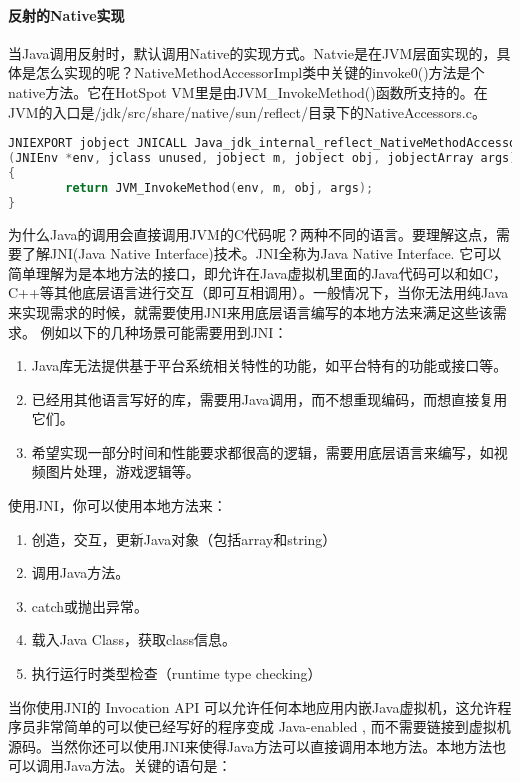\documentclass[../../../interview-questions.tex]{subfiles}
\begin{document}
\paragraph{反射的Native实现}

当Java调用反射时，默认调用Native的实现方式。Natvie是在JVM层面实现的，具体是怎么实现的呢？NativeMethodAccessorImpl类中关键的invoke0()方法是个native方法。它在HotSpot VM里是由JVM\_InvokeMethod()函数所支持的。在JVM的入口是/jdk/src/share/native/sun/reflect/目录下的NativeAccessors.c。

\begin{lstlisting}[language=C]
JNIEXPORT jobject JNICALL Java_jdk_internal_reflect_NativeMethodAccessorImpl_invoke0
(JNIEnv *env, jclass unused, jobject m, jobject obj, jobjectArray args)
{
        return JVM_InvokeMethod(env, m, obj, args);
}
\end{lstlisting}

为什么Java的调用会直接调用JVM的C代码呢？两种不同的语言。要理解这点，需要了解JNI(Java Native Interface)技术。JNI全称为Java Native Interface. 它可以简单理解为是本地方法的接口，即允许在Java虚拟机里面的Java代码可以和如C，C++等其他底层语言进行交互（即可互相调用）。一般情况下，当你无法用纯Java来实现需求的时候，就需要使用JNI来用底层语言编写的本地方法来满足这些该需求。
例如以下的几种场景可能需要用到JNI：

\begin{enumerate}
        \item {Java库无法提供基于平台系统相关特性的功能，如平台特有的功能或接口等。}
        \item{已经用其他语言写好的库，需要用Java调用，而不想重现编码，而想直接复用它们。}
        \item {希望实现一部分时间和性能要求都很高的逻辑，需要用底层语言来编写，如视频图片处理，游戏逻辑等。}
\end{enumerate}

使用JNI，你可以使用本地方法来：

\begin{enumerate}
        \item {创造，交互，更新Java对象（包括array和string）}
        \item {调用Java方法。}
        \item {catch或抛出异常。}
        \item {载入Java Class，获取class信息。}
        \item {执行运行时类型检查（runtime type checking）}
\end{enumerate}

当你使用JNI的 Invocation API 可以允许任何本地应用内嵌Java虚拟机，这允许程序员非常简单的可以使已经写好的程序变成 Java-enabled , 而不需要链接到虚拟机源码。当然你还可以使用JNI来使得Java方法可以直接调用本地方法。本地方法也可以调用Java方法。关键的语句是：
\end{document}

